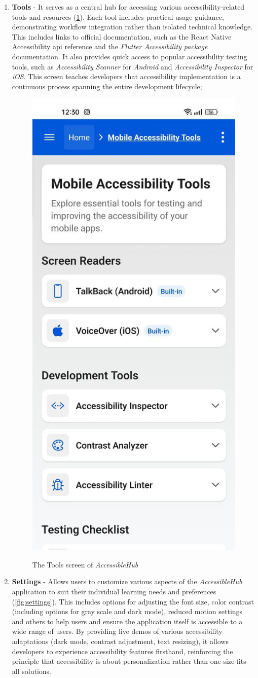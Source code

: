 \begin{enumerate}
\pagebreak

\item \textbf{Tools} - It serves as a central hub for accessing various accessibility-related tools and resources (\ref{fig:tools}). Each tool includes practical usage guidance, demonstrating workflow integration rather than isolated technical knowledge. This includes links to official documentation, such as the React Native Accessibility \acrshort{api} reference and the \textit{Flutter Accessibility package} documentation. It also provides quick access to popular accessibility testing tools, such as \textit{Accessibility Scanner} for \textit{Android} and \textit{Accessibility Inspector} for \textit{iOS}. This screen teaches developers that accessibility implementation is a continuous process spanning the entire development lifecycle; 

\begin{figure}[ht]
\centering
\includegraphics[width=0.4\linewidth, alt={Screenshot of the Tools screen of AccessibleHub}]{img/tools.jpg}
\caption{The Tools screen of \textit{AccessibleHub}}\label{fig:tools}
\end{figure}

\pagebreak

\item \textbf{Settings} - Allows users to customize various aspects of the \textit{AccessibleHub} application to suit their individual learning needs and preferences (\ref{fig:settings}). This includes options for adjusting the font size, color contrast (including options for gray scale and dark mode), reduced motion settings and others to help users and ensure the application itself is accessible to a wide range of users. By providing live demos of various accessibility adaptations (dark mode, contrast adjustment, text resizing), it allows developers to experience accessibility features firsthand, reinforcing the principle that accessibility is about personalization rather than one-size-fits-all solutions.


\end{enumerate}
